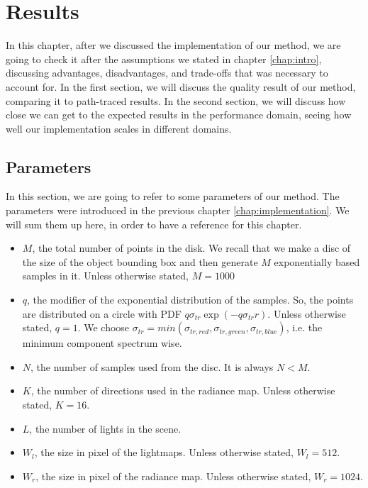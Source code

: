 \chapter{Results}
\label{chap:results}
In this chapter, after we discussed the implementation of our method, we are going to check it after the assumptions we stated in chapter \ref{chap:intro}, discussing advantages, disadvantages, and trade-offs that was necessary to account for. In the first section, we will discuss the quality result of our method, comparing it to path-traced results. In the second section, we will discuss how close we can get to the expected results in the performance domain, seeing how well our implementation scales in different domains. 

\section{Parameters}
\label{sec:parameters}
In this section, we are going to refer to some parameters of our method. The parameters were introduced in the previous chapter \ref{chap:implementation}. We will sum them up here, in order to have a reference for this chapter.

\begin{itemize}
\item $M$, the total number of points in the disk. We recall that we make a disc of the size of the object bounding box and then generate $M$ exponentially based samples in it. Unless otherwise stated, $M = 1000$
\item $q$, the modifier of the exponential distribution of the samples. So, the points are distributed on a circle with PDF $q \sigma_{tr}\exp(-q\sigma_{tr} r)$. Unless otherwise stated, $q = 1$. We choose $\sigma_{tr} = min(\sigma_{tr, red},\sigma_{tr, green},\sigma_{tr, blue})$, i.e. the minimum component spectrum wise.
\item $N$, the number of samples used from the disc. It is always $N < M$.
\item $K$, the number of directions used in the radiance map. Unless otherwise stated, $K = 16$. 
\item $L$, the number of lights in the scene. 
\item $W_l$, the size in pixel of the lightmaps. Unless otherwise stated, $W_l = 512$.
\item $W_r$, the size in pixel of the radiance map. Unless otherwise stated, $W_r = 1024$.
\end{itemize}


